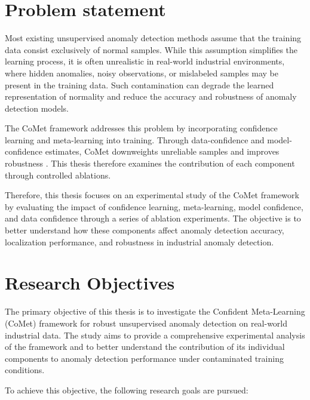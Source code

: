 \documentclass[12pt,openany,oneside]{book}
\begin{document}
\section{Problem statement }


Most existing unsupervised anomaly detection methods assume that the training data consist exclusively of normal samples. While this assumption simplifies the learning process, it is often unrealistic in real-world industrial environments, where hidden anomalies, noisy observations, or mislabeled samples may be present in the training data. Such contamination can degrade the learned representation of normality and reduce the accuracy and robustness of anomaly detection models.

The CoMet framework addresses this problem by incorporating confidence learning and meta-learning into training. Through data-confidence and model-confidence estimates, CoMet downweights unreliable samples and improves robustness \cite{aqeel2025comet}. This thesis therefore examines the contribution of each component through controlled ablations.

Therefore, this thesis focuses on an experimental study of the CoMet framework by evaluating the impact of confidence learning, meta-learning, model confidence, and data confidence through a series of ablation experiments. The objective is to better understand how these components affect anomaly detection accuracy, localization performance, and robustness in industrial anomaly detection.


\section{Research Objectives}

The primary objective of this thesis is to investigate the Confident Meta-Learning (CoMet) framework for robust unsupervised anomaly detection on real-world industrial data. The study aims to provide a comprehensive experimental analysis of the framework and to better understand the contribution of its individual components to anomaly detection performance under contaminated training conditions.

To achieve this objective, the following research goals are pursued:
\end{document}
